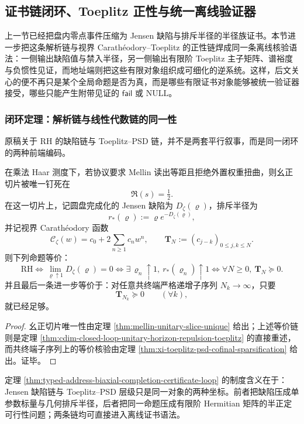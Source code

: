 \subsection{证书链闭环、Toeplitz 正性与统一离线验证器}\label{subsec:typed-address-biaxial-completion-certificate-loop-toeplitz-offline-verifier}
上一节已经把盘内零点事件压缩为 Jensen 缺陷与排斥半径的半径族证书。本节进一步把这条解析链与视界 Carath\'eodory--Toeplitz 的正性链焊成同一条离线核验语法：一侧输出缺陷值与禁入半径，另一侧输出有限阶 Toeplitz 主子矩阵、谱裕度与负惯性见证，而地址端则把这些有限对象组织成可细化的逆系统。这样，后文关心的便不再只是某个全局命题是否为真，而是哪些有限证书对象能够被统一验证器接受，哪些只能产生附带见证的 \(\mathsf{fail}\) 或 \(\mathrm{NULL}\)。

\subsubsection{闭环定理：解析链与线性代数链的同一性}\label{subsubsec:typed-address-biaxial-completion-certificate-loop}
原稿关于 RH 的缺陷链与 Toeplitz--PSD 链，并不是两套平行叙事，而是同一闭环的两种前端编码。

\begin{theorem}[闭环定理的双证书表述]\label{thm:typed-address-biaxial-completion-certificate-loop}
在乘法 Haar 测度下，若协议要求 Mellin 读出等距且拒绝外置权重扭曲，则幺正切片被唯一钉死在
\[
\Re(s)=\tfrac12.
\]
在这一切片上，记圆盘完成化的 Jensen 缺陷为 \(D_{\zeta}(\varrho)\)，排斥半径为
\[
r_{\ast}(\varrho):=\varrho e^{-D_{\zeta}(\varrho)},
\]
并记视界 Carath\'eodory 函数
\[
\mathscr{C}_{\zeta}(w)=c_0+2\sum_{n\ge 1}c_n w^n,
\qquad
\mathbf{T}_N:=(c_{j-k})_{0\le j,k\le N}.
\]
则下列命题等价：
\[
\mathrm{RH}
\iff
\lim_{\varrho\uparrow 1}D_{\zeta}(\varrho)=0
\iff
\exists\,\varrho_n\uparrow 1,\ r_{\ast}(\varrho_n)\uparrow 1
\iff
\forall N\ge 0,\ \mathbf{T}_N\succeq 0.
\]
并且最后一条进一步等价于：对任意共终端严格递增子序列 \(N_k\to\infty\)，只要
\[
\mathbf{T}_{N_k}\succeq 0\qquad(\forall k),
\]
就已经足够。
\end{theorem}
\begin{proof}
幺正切片唯一性由定理 \ref{thm:mellin-unitary-slice-unique} 给出；上述等价链则是定理 \ref{thm:cdim-closed-loop-unitary-horizon-repulsion-toeplitz} 的直接重述，而共终端子序列上的等价核验由定理 \ref{thm:xi-toeplitz-psd-cofinal-sparsification} 给出。证毕。
\end{proof}

定理 \ref{thm:typed-address-biaxial-completion-certificate-loop} 的制度含义在于：Jensen 缺陷链与 Toeplitz--PSD 层级只是同一对象的两种坐标。前者把缺陷压成单参数标量与几何排斥半径，后者把同一命题压成有限阶 Hermitian 矩阵的半正定可行性问题；两条链均可直接进入离线证书语法。

